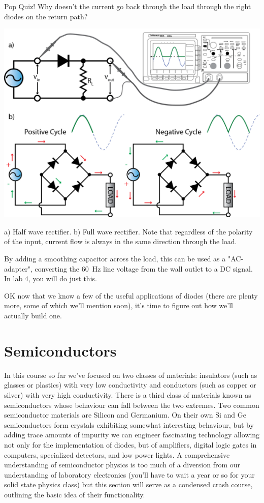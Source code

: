 \documentclass{tufte-book}
\begin{document}
\begin{myexample}[label = ex:welches_wegen_diode]{Pop Quiz!}
Why doesn't the current go back through the load through the right diodes on the return path?
\end{myexample}

\begin{marginfigure}%
  \includegraphics[]{rectification_half_full}
  \caption{a) Half wave rectifier. b) Full wave rectifier. Note that regardless of the polarity of the input, current flow is always in the same direction through the load.}
  \label{fig:rect_half_full}
\end{marginfigure}

By adding a smoothing capacitor across the load, this can be used as a "AC-adapter", converting the 60~Hz line voltage from the wall outlet to a DC signal. In lab 4, you will do just this.

OK now that we know a few of the useful applications of diodes (there are plenty more, some of which we'll mention soon), it's time to figure out how we'll actually build one. 

\section{Semiconductors}
In this course so far we've focused on two classes of materials: insulators (such as glasses or plastics) with very low conductivity and conductors (such as copper or silver) with very high conductivity. There is a third class of materials known as semiconductors whose behaviour can fall between the two extremes. Two common semiconductor materials are Silicon and Germanium. On their own Si and Ge semiconductors form crystals exhibiting somewhat interesting behaviour, but by adding trace amounts of impurity we can engineer fascinating technology allowing not only for the implementation of diodes, but of amplifiers, digital logic gates in computers, specialized detectors, and low power lights. A comprehensive understanding of semiconductor physics is too much of a diversion from our understanding of laboratory electronics (you'll have to wait a year or so for your solid state physics class) but this section will serve as a condensed crash course, outlining the basic idea of their functionality.
\end{document}
